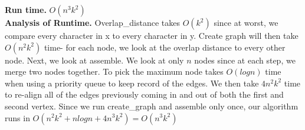 \documentclass[11pt]{article}
\begin{document}
\noindent\textbf{Run time.} $O(n^3k^2)$\\

\noindent\textbf{Analysis of Runtime.} Overlap\_distance takes $O(k^2)$ since at worst, we compare every character in x to every character in y.  Create graph will then take $O(n^2k^2)$ time- for each node, we look at the overlap distance to every other node.  Next, we look at assemble.  We look at only $n$ nodes since at each step, we merge two nodes together.  To pick the maximum node takes $O(log n)$ time when using a priority queue to keep record of the edges.  We then take $4n^2k^2$ time to re-align all of the edges previously coming in and out of both the first and second vertex.  Since we run create\_graph and assemble only once, our algorithm runs in $O(n^2k^2 + n log n + 4n^3k^2) = O(n^3k^2)$
\end{document}
